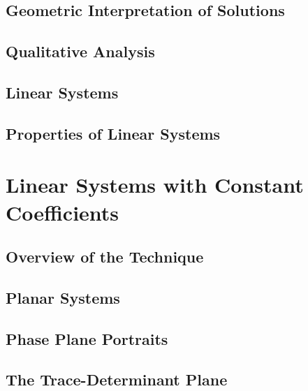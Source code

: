 \documentclass{package/notes}
\begin{document}
\section{Geometric Interpretation of Solutions}

\section{Qualitative Analysis}

\section{Linear Systems}

\section{Properties of Linear Systems}




\chapter{Linear Systems with Constant Coefficients}

\section{Overview of the Technique}

\section{Planar Systems}

\section{Phase Plane Portraits}

\section{The Trace-Determinant Plane}
\end{document}
